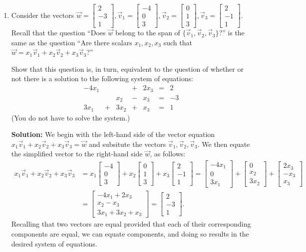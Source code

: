 \documentclass[12pt]{article}
\newcommand{\bbm}{\begin{bmatrix}}
\newcommand{\ebm}{\end{bmatrix}}
\begin{document}
\thispagestyle{fancy}
 \begin{enumerate}
 
\item Consider the vectors $\vec{w} = \bbm 2\\-3\\1\ebm, \vec{v}_1 = \bbm -4\\0\\3\ebm, \vec{v}_2 = \bbm 0\\1\\3\ebm, \vec{v}_3=\bbm 2\\-1\\1\ebm$.\\
Recall that the question ``Does $\vec{w}$ belong to the span of $\{\vec{v}_1,\vec{v}_2,\vec{v}_3\}$?'' is the same as the question ``Are there scalars $x_1,x_2,x_3$ such that $\vec{w} = x_1\vec{v}_1+x_2\vec{v}_2+x_3\vec{v}_3$?''

Show that this question is, in turn, equivalent to the question of whether or not there is a solution to the following system of equations:
\[
 \begin{array}{ccccccc}
  -4x_1 & & &+&2x_3&=&2\\
   & &x_2&-&x_3&=&-3\\
 3x_1&+&3x_2&+&x_3&=&1
 \end{array}
\]
(You do not have to solve the system.)

\bigskip

{\bf Solution:} We begin with the left-hand side of the vector equation $x_1\vec{v}_1+x_2\vec{v}_2+x_3\vec{v}_3=\vec{w}$ and subsitute the vectors $\vec{v}_1,\vec{v}_2,\vec{v}_3$. We then equate the simplified vector to the right-hand side $\vec{w}$, as follows:
\begin{align*}
 x_1\vec{v}_1+x_2\vec{v}_2+x_3\vec{v}_3 &= x_1\bbm -4\\0\\3\ebm+x_2\bbm 0\\1\\3\ebm+x_3\bbm 2\\-1\\1\ebm = \bbm -4x_1\\0\\3x_1\ebm+\bbm 0\\x_2\\3x_2\ebm+\bbm 2x_3\\-x_3\\x_3\ebm\\&= \bbm -4x_1+2x_3\\x_2-x_3\\3x_1+3x_2+x_3\ebm = \bbm 2\\-3\\1\ebm.
\end{align*}
Recalling that two vectors are equal provided that each of their corresponding components are equal, we can equate components, and doing so results in the desired system of equations.


\end{enumerate}
\end{document}
